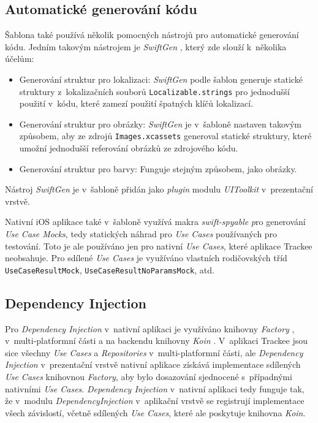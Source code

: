 \subsection{Automatické generování kódu}

Šablona také používá několik pomocných nástrojů pro automatické generování kódu. Jedním takovým nástrojem je \emph{SwiftGen} \cite{swiftgen}, který zde slouží k~několika účelům:
\begin{itemize}
\item Generování struktur pro lokalizaci: \emph{SwiftGen} podle šablon generuje statické struktury z~lokalizačních souborů \texttt{Localizable.strings} pro jednodušší použití v~kódu, které zamezí použití špatných klíčů lokalizací.
\item Generování struktur pro obrázky: \emph{SwiftGen} je v~šabloně nastaven takovým způsobem, aby ze zdrojů \texttt{Images.xcassets} generoval statické struktury, které umožní jednodušší referování obrázků ze zdrojového kódu.
\item Generování struktur pro barvy: Funguje stejným způsobem, jako obrázky.
\end{itemize}
Nástroj \emph{SwiftGen} je v~šabloně přidán jako \emph{plugin} modulu \emph{UIToolkit} v~prezentační vrstvě.

Nativní iOS aplikace také v~šabloně využívá makra \emph{swift-spyable} \cite{swift-spyable} \emph pro generování \emph{Use Case Mocks}, tedy statických náhrad pro \emph{Use Cases} používaných pro testování. Toto je ale používáno jen pro nativní \emph{Use Cases}, které aplikace Trackee neobsahuje. Pro sdílené \emph{Use Cases} je využíváno vlastních rodičovských tříd \texttt{UseCaseResultMock}, \texttt{UseCaseResultNoParamsMock}, atd.

\subsection{Dependency Injection}

Pro \emph{Dependency Injection} v~nativní aplikaci je využíváno knihovny \emph{Factory} \cite{factory}, v~multi-platformní části a na backendu knihovny \emph{Koin} \cite{koin}. V~aplikaci Trackee jsou sice všechny \emph{Use Cases} a \emph{Repositories} v~multi-platformní části, ale \emph{Dependency Injection} v~prezentační vrstvě nativní aplikace získává implementace sdílených \emph{Use Cases} knihovnou \emph{Factory}, aby bylo dosazování sjednocené s~případnými nativními \emph{Use Cases}. \emph{Dependency Injection} v~nativní aplikaci tedy funguje tak, že v~modulu \emph{DependencyInjection} v~aplikační vrstvě se registrují implementace všech závislostí, včetně sdílených \emph{Use Cases}, které ale poskytuje knihovna \emph{Koin}.

